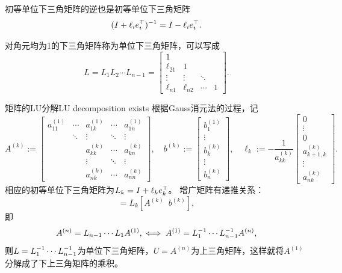\begin{corollary}
    初等单位下三角矩阵的逆也是初等单位下三角矩阵
    \begin{equation}
        (I+\ell_ie_i^\top)^{-1}=I-\ell_ie_i^\top.
    \end{equation}
\end{corollary}

\begin{corollary}
    对角元均为1的下三角矩阵称为单位下三角矩阵，可以写成
    \[
        L=L_1L_2\cdots L_{n-1}=\begin{bmatrix}
            1\\\ell_{21}&1\\ \vdots&\vdots&\ddots\\
            \ell_{n1}&\ell_{n2}&\cdots&1
        \end{bmatrix}.
    \]
\end{corollary}

\begin{theorem}
    {矩阵的LU分解}{LU decomposition exists}
    根据Gauss消元法的过程，记
    \[
        A^{(k)}:=\begin{bmatrix}
            a_{11}^{(1)}&\cdots&a_{1k}^{(1)}&\cdots&a_{1n}^{(1)}\\
            &\ddots&\vdots&\ddots&\vdots\\
            &&a_{kk}^{(k)}&\cdots&a_{kn}^{(k)}\\
            &&\vdots&\ddots&\vdots\\
            &&a_{nk}^{(k)}&\cdots&a_{nn}^{(k)}
        \end{bmatrix},\quad
        b^{(k)}:=\begin{bmatrix}
            b_1^{(1)}\\\vdots\\b_k^{(k)}\\\vdots\\b_n^{(k)}
        \end{bmatrix},\quad\ell_k:=-\frac1{a_{kk}^{(k)}}\begin{bmatrix}
            0\\\vdots\\0\\a_{k+1,k}^{(k)}\\\vdots\\a_{nk}^{(k)}
        \end{bmatrix}.
    \]
    相应的初等单位下三角矩阵为$L_k=I+\ell_ke_k^\top$。
    增广矩阵有递推关系：
    \begin{equation}
        [A^{(k+1)}\enspace b^{(k+1)}]=L_k[A^{(k)}\enspace b^{(k)}],
    \end{equation}
    即
    \[
        A^{(n)}=L_{n-1}\cdots L_1A^{(1)},\iff A^{(1)}=L_1^{-1}\cdots L_{n-1}^{-1} A^{(n)},
    \]
    则$L=L_1^{-1}\cdots L_{n-1}^{-1}$为单位下三角矩阵，$U=A^{(n)}$为上三角矩阵，这样就将$A^{(1)}$分解成了下上三角矩阵的乘积。    
\end{theorem}

